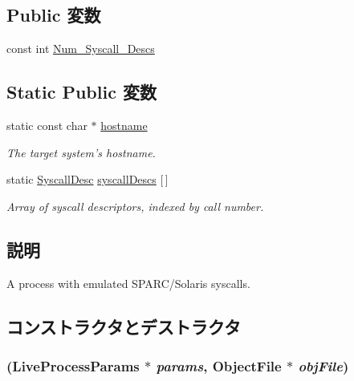 \subsection*{Public 変数}
\begin{DoxyCompactItemize}
\item 
const int \hyperlink{classSparcISA_1_1SparcSolarisProcess_a9534988905c6f5c8c57c4b6a7b179fea}{Num\_\-Syscall\_\-Descs}
\end{DoxyCompactItemize}
\subsection*{Static Public 変数}
\begin{DoxyCompactItemize}
\item 
static const char $\ast$ \hyperlink{classSparcISA_1_1SparcSolarisProcess_aad01339e89106fdf68f57ef118956fa9}{hostname}
\begin{DoxyCompactList}\small\item\em The target system's hostname. \item\end{DoxyCompactList}\item 
static \hyperlink{classSyscallDesc}{SyscallDesc} \hyperlink{classSparcISA_1_1SparcSolarisProcess_a08d67a94820b75842e07f030e548372e}{syscallDescs} \mbox{[}$\,$\mbox{]}
\begin{DoxyCompactList}\small\item\em Array of syscall descriptors, indexed by call number. \item\end{DoxyCompactList}\end{DoxyCompactItemize}


\subsection{説明}
A process with emulated SPARC/Solaris syscalls. 

\subsection{コンストラクタとデストラクタ}
\hypertarget{classSparcISA_1_1SparcSolarisProcess_a45c41956df37f9c80048847e39d7e444}{
\subsubsection[{SparcSolarisProcess}]{ (LiveProcessParams $\ast$ {\em params}, \/  {\bf ObjectFile} $\ast$ {\em objFile})}}
\label{classSparcISA_1_1SparcSolarisProcess_a45c41956df37f9c80048847e39d7e444}


